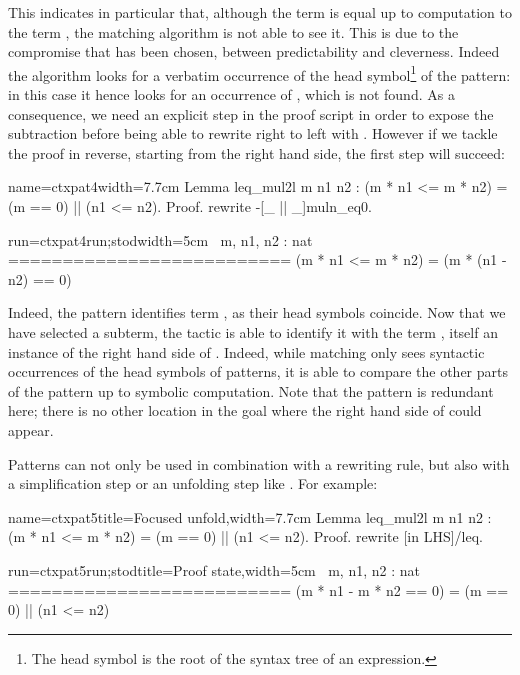 This indicates in particular that, although the term 
is equal up to computation to the term , the matching
algorithm is not able to see it. This is due to the compromise that
has been chosen, between predictability and cleverness. Indeed the
algorithm looks for a verbatim occurrence of the
head symbol\footnote{The head symbol is the root of the syntax tree
of an expression.}
of the
pattern: in this case it hence looks for an occurrence of \C{(_ - _)},
which is not found. As a consequence, we need an explicit step in the
proof script in order to expose the subtraction before being able to
rewrite right to left with . However if we tackle the proof
in reverse, starting from the right hand side, the first 
step will succeed:

\begin{coq-left}{name=ctxpat4}{width=7.7cm}
Lemma leq_mul2l m n1 n2 :
(m * n1 <= m * n2) =
  (m == 0) || (n1 <= n2).
Proof.
rewrite -[_ || _]muln_eq0.
\end{coq-left}
\begin{coqout-right}{run=ctxpat4run;stod}{width=5cm}
$~$
m, n1, n2 : nat
==========================
(m * n1 <= m * n2) =
  (m * (n1 - n2) == 0)
\end{coqout-right}

Indeed, the \C{[_ || _]} pattern identifies term , as
their head symbols coincide. Now that we have selected a subterm, the
 tactic is able to identify it with the term
, itself an instance of the right hand side
of . Indeed,
while matching only sees syntactic occurrences of the
head symbols of patterns, it is able to compare the other parts of the
pattern up to symbolic computation.
Note that the \C{[_ || _]} pattern is redundant here; there is no
other location in the goal where the right hand side of 
could appear.

Patterns can not only be used in combination with a rewriting rule,
but also with a simplification step \C{/=} or an unfolding step
like . For example:

\begin{coq-left}{name=ctxpat5}{title=Focused unfold,width=7.7cm}
Lemma leq_mul2l m n1 n2 :
(m * n1 <= m * n2) =
  (m == 0) || (n1 <= n2).
Proof.
rewrite [in LHS]/leq.
\end{coq-left}
\begin{coqout-right}{run=ctxpat5run;stod}{title=Proof state,width=5cm}
$~$
m, n1, n2 : nat
==========================
(m * n1 - m * n2 == 0) =
  (m == 0) || (n1 <= n2)
\end{coqout-right}

